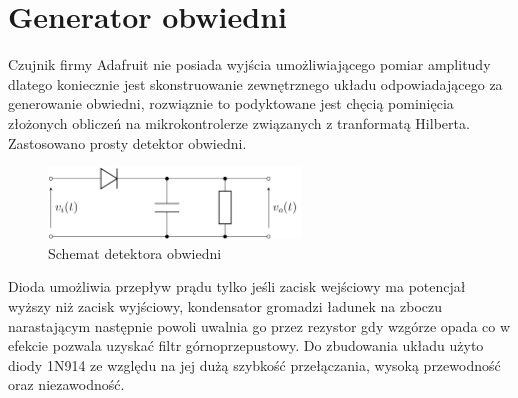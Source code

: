 \documentclass[eng,printmode]{mgr}
\begin{document}
\section{Generator obwiedni}
Czujnik firmy Adafruit nie posiada wyjścia umożliwiającego pomiar amplitudy dlatego koniecznie jest skonstruowanie zewnętrznego układu odpowiadającego za generowanie obwiedni, rozwiąznie to podyktowane jest chęcią pominięcia złożonych obliczeń na mikrokontrolerze związanych z tranformatą Hilberta. Zastosowano prosty detektor obwiedni.
\begin{figure}

    \centering

  \includegraphics[width=0.6\textwidth, angle=0]{obwiednia.png}

    \caption{Schemat detektora obwiedni}


\end{figure}
\newpage
Dioda umożliwia przepływ prądu tylko jeśli zacisk wejściowy ma potencjał wyższy niż zacisk wyjściowy, kondensator gromadzi ładunek na zboczu narastającym następnie powoli uwalnia go przez rezystor gdy wzgórze opada co w efekcie pozwala uzyskać  filtr górnoprzepustowy. Do zbudowania układu użyto diody 1N914 ze względu na jej dużą szybkość przełączania, wysoką przewodność oraz niezawodność. 
\end{document}
